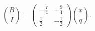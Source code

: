 \[\binom BI=\begin{pmatrix}-\frac{7}{4}&-\frac{9}{4}\\\frac{1}{2}&-\frac{1}{2}\end{pmatrix}\binom xq.\]
